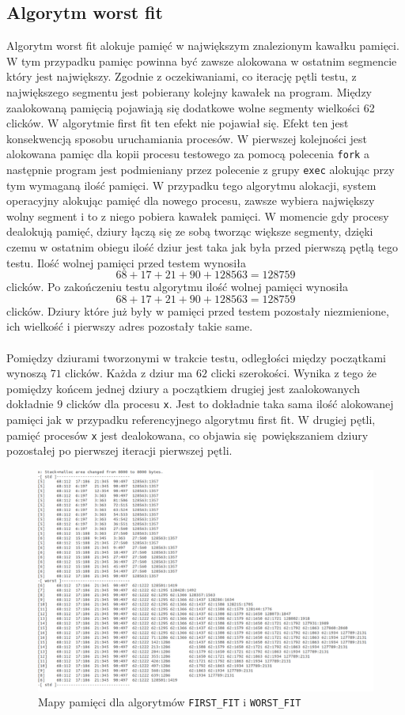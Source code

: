 \documentclass{mwrep}
\begin{document}
\subsection{Algorytm worst fit}
Algorytm worst fit alokuje pamięć w największym znalezionym kawałku pamięci. W tym przypadku pamięc powinna być zawsze alokowana w ostatnim segmencie 
który jest największy. Zgodnie z oczekiwaniami, co iterację pętli testu, z największego segmentu jest pobierany kolejny kawałek na program.
Między zaalokowaną pamięcią pojawiają się dodatkowe wolne segmenty wielkości 62 clicków. W algorytmie first fit ten efekt nie pojawiał się. Efekt ten jest konsekwencją sposobu uruchamiania procesów. W pierwszej kolejności 
jest alokowana pamięc dla kopii procesu testowego za pomocą polecenia \texttt{fork} a następnie program jest podmieniany przez polecenie z 
grupy \texttt{exec} alokując przy tym wymaganą ilość pamięci. W przypadku tego algorytmu alokacji, system operacyjny alokując pamięć dla nowego procesu, zawsze wybiera największy wolny segment i 
to z niego pobiera kawałek pamięci. W momencie gdy procesy dealokują pamięć, dziury łączą się ze sobą tworząc większe segmenty, dzięki czemu w ostatnim obiegu 
ilość dziur jest taka jak była przed pierwszą pętlą tego testu. Ilość wolnej pamięci przed
testem wynosiła $$ 68 + 17 + 21 + 90 + 128563 = 128759 $$ clicków. Po zakończeniu testu algorytmu ilość wolnej pamięci wynosiła 
$$ 68 + 17 + 21 + 90 + 128563 = 128759 $$ clicków. Dziury które już były w pamięci przed testem pozostały niezmienione, ich wielkość i pierwszy adres pozostały 
takie same. \\
\\
Pomiędzy dziurami tworzonymi w trakcie testu, odległości między początkami wynoszą $71$ clicków. Każda z dziur ma $62$ clicki szerokości. Wynika z tego że pomiędzy końcem 
jednej dziury a początkiem drugiej jest zaalokowanych dokładnie $9$ clicków dla procesu \texttt{x}. Jest to dokładnie taka sama ilość alokowanej pamięci jak w przypadku
referencyjnego algorytmu first fit. W drugiej pętli, pamięć procesów \texttt{x} jest dealokowana, co objawia się powiększaniem dziury pozostałej po pierwszej iteracji pierwszej pętli.


\begin{figure}[H]
	\centering
    \includegraphics[width=15cm]{test.png}
    \caption{Mapy pamięci dla algorytmów \texttt{FIRST\_{}FIT} i \texttt{WORST\_{}FIT}}
	\label{fig:21}
\end{figure}
\end{document}
